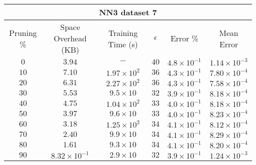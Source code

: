 \begin{adjustwidth}{0cm}{}
\begin{tabular}{cccccc}
\hline
\multicolumn{6}{c}{NN3 dataset 7} \\
\toprule
Pruning \% & Space Overhead (KB) & Training Time (s) & $\epsilon$ & Error \% & Mean Error\\
\midrule
$0$ & $3.94$ & $-$ & $40$ & $4.8 \times 10^{-1}$ & $1.14 \times 10^{-3}$\\
$10$ & $7.10$ & $1.97  \times 10^{2}$ & $36$ & $4.3 \times 10^{-1}$ & $7.80 \times 10^{-4}$\\
$20$ & $6.31$ & $2.27 \times 10^{2}$ & $36$ & $4.3 \times 10^{-1}$ & $7.58 \times 10^{-4}$\\
$30$ & $5.53$ & $9.5 \times 10$ & $32$ & $3.9 \times 10^{-1}$ & $8.18 \times 10^{-4}$\\
$40$ & $4.75$ & $1.04 \times 10^{2}$ & $33$ & $4.0 \times 10^{-1}$ & $8.18 \times 10^{-4}$\\
$50$ & $3.97$ & $9.6 \times 10$ & $33$ & $4.0 \times 10^{-1}$ & $8.23 \times 10^{-4}$\\
$60$ & $3.18$ & $1.25 \times 10^{2}$ & $34$ & $4.1 \times 10^{-1}$ & $8.12 \times 10^{-4}$\\
$70$ & $2.40$ & $9.9 \times 10$ & $34$ & $4.1 \times 10^{-1}$ & $8.29 \times 10^{-4}$\\
$80$ & $1.61$ & $9.3 \times 10$ & $34$ & $4.1 \times 10^{-1}$ & $8.20 \times 10^{-4}$\\
$90$ & $8.32 \times 10^{-1}$ & $2.9 \times 10$ & $32$ & $3.9 \times 10^{-1}$ & $1.24 \times 10^{-3}$\\
\bottomrule
\end{tabular}
\end{adjustwidth}

\par\null\par
\par\null\par

